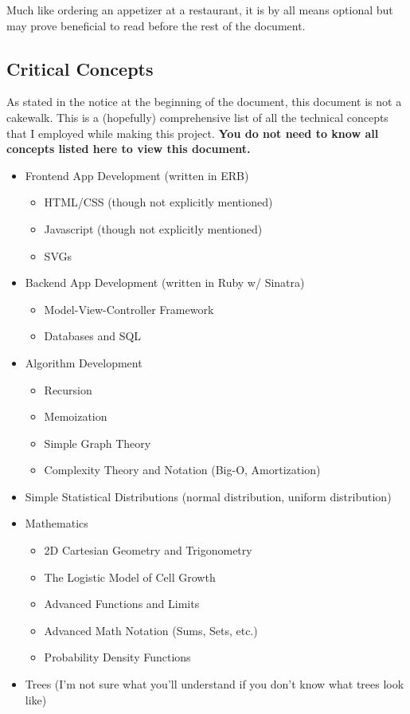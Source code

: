 Much like ordering an appetizer at a restaurant, it is by all means optional but may prove beneficial to read before the rest of the document.

\subsection{Critical Concepts}

As stated in the notice at the beginning of the document, this document is not a cakewalk. This is a (hopefully) comprehensive list of all the technical concepts that I employed while making this project. \textbf{You do not need to know all concepts listed here to view this document.}

\begin{itemize}
    \item Frontend App Development (written in ERB)
    \begin{itemize}
        \item HTML/CSS (though not explicitly mentioned)
        \item Javascript (though not explicitly mentioned)
        \item SVGs
    \end{itemize}
    \item Backend App Development (written in Ruby w/ Sinatra)
    \begin{itemize}
        \item Model-View-Controller Framework
        \item Databases and SQL
    \end{itemize}
    \item Algorithm Development
    \begin{itemize}
        \item Recursion
        \item Memoization
        \item Simple Graph Theory
        \item Complexity Theory and Notation (Big-O, Amortization)
    \end{itemize}
    \item Simple Statistical Distributions (normal distribution, uniform distribution)
    \item Mathematics
    \begin{itemize}
        \item 2D Cartesian Geometry and Trigonometry
        \item The Logistic Model of Cell Growth
        \item Advanced Functions and Limits
        \item Advanced Math Notation (Sums, Sets, etc.)
        \item Probability Density Functions
    \end{itemize}
    \item Trees (I'm not sure what you'll understand if you don't know what trees look like)
\end{itemize}

